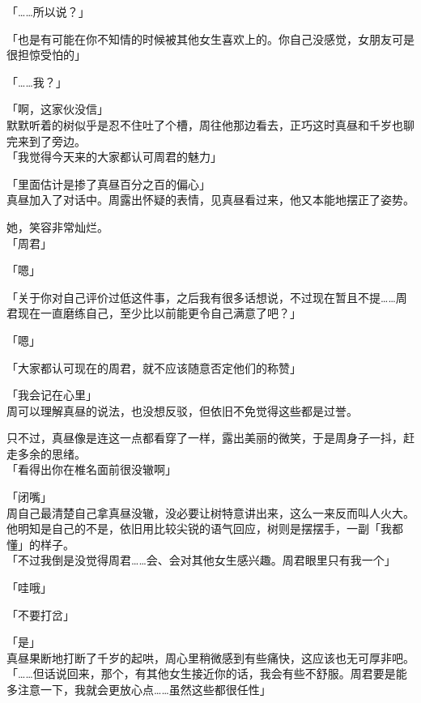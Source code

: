 「……所以说？」

「也是有可能在你不知情的时候被其他女生喜欢上的。你自己没感觉，女朋友可是很担惊受怕的」

「……我？」

「啊，这家伙没信」\\

默默听着的树似乎是忍不住吐了个槽，周往他那边看去，正巧这时真昼和千岁也聊完来到了旁边。\\

「我觉得今天来的大家都认可周君的魅力」

「里面估计是掺了真昼百分之百的偏心」\\

真昼加入了对话中。周露出怀疑的表情，见真昼看过来，他又本能地摆正了姿势。

她，笑容非常灿烂。\\

「周君」

「嗯」

「关于你对自己评价过低这件事，之后我有很多话想说，不过现在暂且不提……周君现在一直磨练自己，至少比以前能更令自己满意了吧？」

「嗯」

「大家都认可现在的周君，就不应该随意否定他们的称赞」

「我会记在心里」\\

周可以理解真昼的说法，也没想反驳，但依旧不免觉得这些都是过誉。

只不过，真昼像是连这一点都看穿了一样，露出美丽的微笑，于是周身子一抖，赶走多余的思绪。\\

「看得出你在椎名面前很没辙啊」

「闭嘴」\\

周自己最清楚自己拿真昼没辙，没必要让树特意讲出来，这么一来反而叫人火大。他明知是自己的不是，依旧用比较尖锐的语气回应，树则是摆摆手，一副「我都懂」的样子。\\

「不过我倒是没觉得周君……会、会对其他女生感兴趣。周君眼里只有我一个」

「哇哦」

「不要打岔」

「是」\\

真昼果断地打断了千岁的起哄，周心里稍微感到有些痛快，这应该也无可厚非吧。\\

「……但话说回来，那个，有其他女生接近你的话，我会有些不舒服。周君要是能多注意一下，我就会更放心点……虽然这些都很任性」

